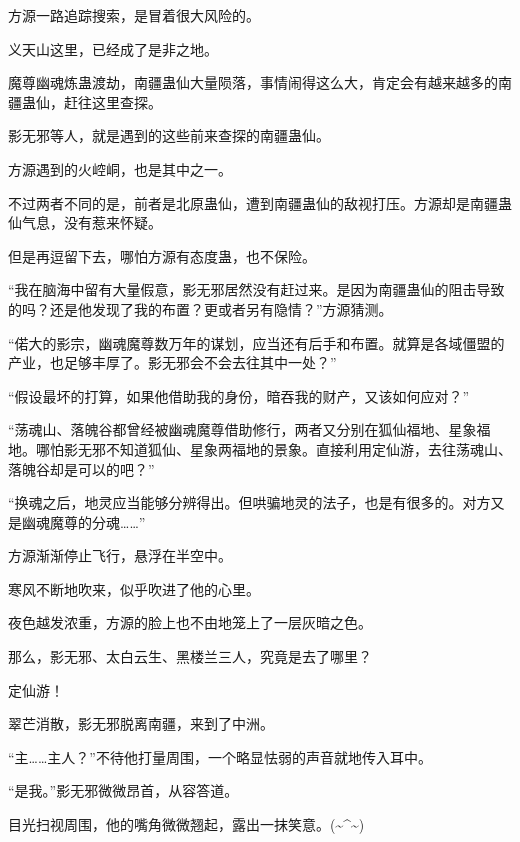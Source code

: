 \begin{this_body}
方源一路追踪搜索，是冒着很大风险的。

义天山这里，已经成了是非之地。

魔尊幽魂炼蛊渡劫，南疆蛊仙大量陨落，事情闹得这么大，肯定会有越来越多的南疆蛊仙，赶往这里查探。

影无邪等人，就是遇到的这些前来查探的南疆蛊仙。

方源遇到的火崆峒，也是其中之一。

不过两者不同的是，前者是北原蛊仙，遭到南疆蛊仙的敌视打压。方源却是南疆蛊仙气息，没有惹来怀疑。

但是再逗留下去，哪怕方源有态度蛊，也不保险。

“我在脑海中留有大量假意，影无邪居然没有赶过来。是因为南疆蛊仙的阻击导致的吗？还是他发现了我的布置？更或者另有隐情？”方源猜测。

“偌大的影宗，幽魂魔尊数万年的谋划，应当还有后手和布置。就算是各域僵盟的产业，也足够丰厚了。影无邪会不会去往其中一处？”

“假设最坏的打算，如果他借助我的身份，暗吞我的财产，又该如何应对？”

“荡魂山、落魄谷都曾经被幽魂魔尊借助修行，两者又分别在狐仙福地、星象福地。哪怕影无邪不知道狐仙、星象两福地的景象。直接利用定仙游，去往荡魂山、落魄谷却是可以的吧？”

“换魂之后，地灵应当能够分辨得出。但哄骗地灵的法子，也是有很多的。对方又是幽魂魔尊的分魂……”

方源渐渐停止飞行，悬浮在半空中。

寒风不断地吹来，似乎吹进了他的心里。

夜色越发浓重，方源的脸上也不由地笼上了一层灰暗之色。

那么，影无邪、太白云生、黑楼兰三人，究竟是去了哪里？

定仙游！

翠芒消散，影无邪脱离南疆，来到了中洲。

“主……主人？”不待他打量周围，一个略显怯弱的声音就地传入耳中。

“是我。”影无邪微微昂首，从容答道。

目光扫视周围，他的嘴角微微翘起，露出一抹笑意。(\~{}\^{}\~{})

\end{this_body}

